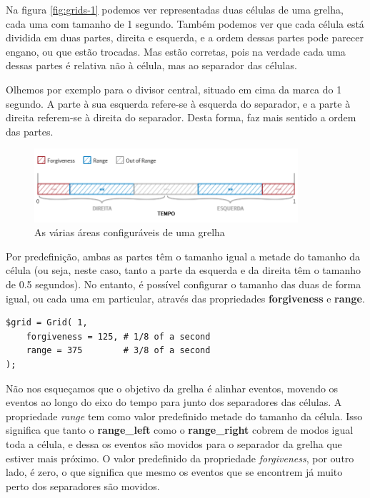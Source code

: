 Na figura \ref{fig:grids-1} podemos ver representadas duas células de uma grelha, cada uma com tamanho de 1 segundo. Também podemos ver que cada célula está dividida em duas partes, direita e esquerda, e a ordem dessas partes pode parecer engano, ou que estão trocadas. Mas estão corretas, pois na verdade cada uma dessas partes é relativa não à célula, mas ao separador das células.

Olhemos por exemplo para o divisor central, situado em cima da marca do 1 segundo. A parte à sua esquerda refere-se à esquerda do separador, e a parte à direita referem-se à direita do separador. Desta forma, faz mais sentido a ordem das partes.

\begin{figure}[h]
\begin{center}
    \includegraphics[width=0.87\textwidth]{img/grids_2.png}
\end{center}
\caption{As várias áreas configuráveis de uma grelha}
\label{fig:grids-2}
\end{figure}

Por predefinição, ambas as partes têm o tamanho igual a metade do tamanho da célula (ou seja, neste caso, tanto a parte da esquerda e da direita têm o tamanho de 0.5 segundos). No entanto, é possível configurar o tamanho das duas de forma igual, ou cada uma em particular, através das propriedades \textbf{forgiveness} e \textbf{range}.

\newpage

\begin{lstlisting}[caption={Código de definição da grelha representada na figura \ref{fig:grids-2}},label={lst:grids-2}]
$grid = Grid( 1,
    forgiveness = 125, # 1/8 of a second
    range = 375        # 3/8 of a second
);
\end{lstlisting}

Não nos esqueçamos que o objetivo da grelha é alinhar eventos, movendo os eventos ao longo do eixo do tempo para junto dos separadores das células. A propriedade \textit{range} tem como valor predefinido metade do tamanho da célula. Isso significa que tanto o \textbf{range\_left} como o \textbf{range\_right} cobrem de modos igual toda a célula, e dessa os eventos são movidos para o separador da grelha que estiver mais próximo. O valor predefinido da propriedade \textit{forgiveness}, por outro lado, é zero, o que significa que mesmo os eventos que se encontrem já muito perto dos separadores são movidos.

